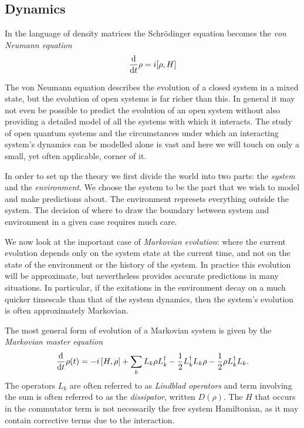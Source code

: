 \subsection{Dynamics}

In the language of density matrices the Schr\"odinger equation becomes the \textit{von Neumann equation}
\begin{align}
  \frac{\mathrm{d}}{\mathrm{d}t} \rho = i [\rho, H]
\end{align}

The von Neumann equation describes the evolution of a closed system in a mixed state, but the evolution of open systems is far richer than this. In general it may not even be possible to predict the evolution of an open system without also providing a detailed model of all the systems with which it interacts. The study of open quantum systems and the circumstances under which an interacting system's dynamics can be modelled alone is vast and here we will touch on only a small, yet often applicable, corner of it.

In order to set up the theory we first divide the world into two parts: the \textit{system} and the \textit{environment}. We choose the system to be the part that we wish to model and make predictions about. The environment represets everything outside the system. The decision of where to draw the boundary between system and environment in a given case requires much care.

We now look at the important case of \textit{Markovian evolution}: where the current evolution depends only on the system state at the current time, and not on the state of the environment or the history of the system. In practice this evolution will be approximate, but nevertheless provides accurate predictions in many situations. In particular, if the exitations in the environment decay on a much quicker timescale than that of the system dynamics, then the system's evolution is often approximately Markovian.

The most general form \cite{lindblad} of evolution of a Markovian system is given by the \textit{Markovian master equation}
\begin{align}\label{master_eq}
  \frac{\mathrm{d}}{\mathrm{d}t} \rho(t) = -i \left[H, \rho\right] + \sum_k L_k \rho L_k^\dagger -\frac{1}{2} L_k^\dagger L_k \rho -\frac{1}{2} \rho L_k^\dagger L_k .
\end{align}
The operators $L_k$ are often referred to as \textit{Lindblad operators} and term involving the sum is often referred to as the \textit{dissipator}, written $D(\rho)$. The $H$ that occurs in the commutator term is not necessarily the free system Hamiltonian, as it may contain corrective terms due to the interaction.

